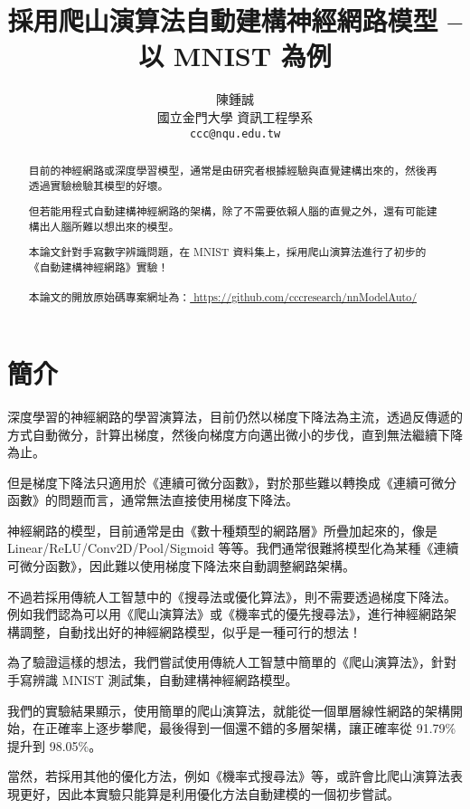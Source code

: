 \documentclass{article}
\title{採用爬山演算法自動建構神經網路模型 -- 以 MNIST 為例}
\author{
    陳鍾誠 \\
    國立金門大學 資訊工程學系\\
    \texttt{ccc@nqu.edu.tw} \\
}
\begin{document}
\maketitle

\begin{abstract}
目前的神經網路或深度學習模型，通常是由研究者根據經驗與直覺建構出來的，然後再透過實驗檢驗其模型的好壞。

但若能用程式自動建構神經網路的架構，除了不需要依賴人腦的直覺之外，還有可能建構出人腦所難以想出來的模型。

本論文針對手寫數字辨識問題，在 MNIST 資料集上，採用爬山演算法進行了初步的《自動建構神經網路》實驗！
\\
\\
本論文的開放原始碼專案網址為：\url{ https://github.com/cccresearch/nnModelAuto/ }
\end{abstract}




\section{簡介}

深度學習的神經網路的學習演算法，目前仍然以梯度下降法為主流，透過反傳遞的方式自動微分，計算出梯度，然後向梯度方向邁出微小的步伐，直到無法繼續下降為止。

但是梯度下降法只適用於《連續可微分函數》，對於那些難以轉換成《連續可微分函數》的問題而言，通常無法直接使用梯度下降法。

神經網路的模型，目前通常是由《數十種類型的網路層》所疊加起來的，像是 Linear/ReLU/Conv2D/Pool/Sigmoid 等等。我們通常很難將模型化為某種《連續可微分函數》，因此難以使用梯度下降法來自動調整網路架構。

不過若採用傳統人工智慧中的《搜尋法或優化算法》，則不需要透過梯度下降法。例如我們認為可以用《爬山演算法》或《機率式的優先搜尋法》，進行神經網路架構調整，自動找出好的神經網路模型，似乎是一種可行的想法！

為了驗證這樣的想法，我們嘗試使用傳統人工智慧中簡單的《爬山演算法》，針對手寫辨識 MNIST 測試集，自動建構神經網路模型。

我們的實驗結果顯示，使用簡單的爬山演算法，就能從一個單層線性網路的架構開始，在正確率上逐步攀爬，最後得到一個還不錯的多層架構，讓正確率從 91.79\% 提升到 98.05\%。

當然，若採用其他的優化方法，例如《機率式搜尋法》等，或許會比爬山演算法表現更好，因此本實驗只能算是利用優化方法自動建模的一個初步嘗試。
\end{document}
